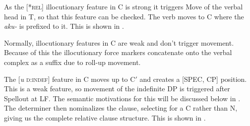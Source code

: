 \documentclass[output=paper]{LSP/langsci}
\begin{document}
\ea \label{boyle36}
{\hspace{1em}}\newline

\z

As the [*\textsc{rel}] illocutionary feature in C is strong it triggers Move of the verbal head in T, so that this feature can be checked. The verb moves to C where the \textit{aku-} is prefixed to it. This is shown in .

\ea	\label{boyle37}
{\hspace{1em}}\newline

\z

Normally, illocutionary features in C are weak and don't trigger movement. Because of this the illocutionary force markers concatenate onto the verbal complex as a suffix due to roll-up movement.  

The [\textit{u} \textsc{d:indef}] feature in C moves up to C$'$ and creates a [SPEC, CP] position. This is a weak feature, so movement of the indefinite DP is triggered after Spellout at LF. The semantic motivations for this will be discussed below in . The determiner then nominalizes the clause, selecting for a C rather than N, giving us the complete relative clause structure. This is shown in .  
\end{document}
